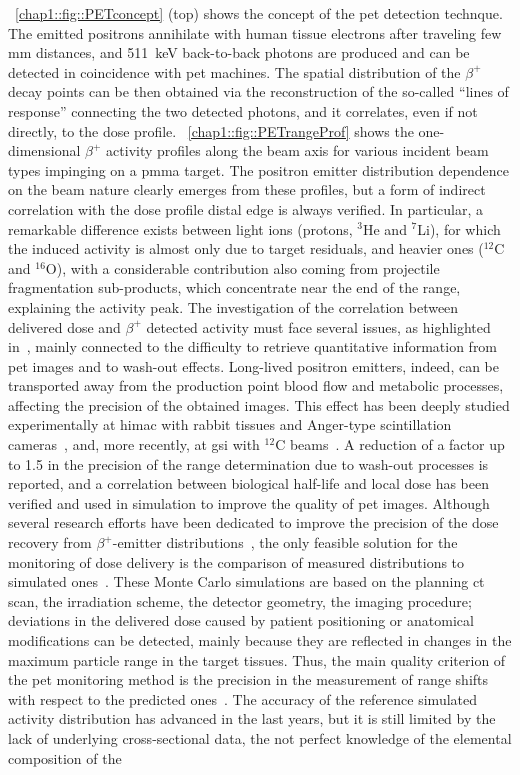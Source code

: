 \figurename~\ref{chap1::fig::PETconcept} (top) shows the concept of the \gls{pet} detection technque. The emitted positrons annihilate with human tissue electrons after traveling few mm distances, and 511~keV back-to-back photons are produced and can be detected in coincidence with \gls{pet} machines. The spatial distribution of the $\beta^+$ decay points can be then obtained via the reconstruction of the so-called \enquote{lines of response} connecting the two detected photons, and it correlates, even if not directly, to the dose profile. \figurename~\ref{chap1::fig::PETrangeProf} shows the one-dimensional $\beta^+$ activity profiles along the beam axis for various incident beam types impinging on a \gls{pmma} target. The positron emitter distribution dependence on the beam nature clearly emerges from these profiles, but a form of indirect correlation with the dose profile distal edge is always verified. In particular, a remarkable difference exists between light ions (protons, $^3$He and $^7$Li), for which the induced activity is almost only due to target residuals, and heavier ones ($^{12}$C and $^{16}$O), with a considerable contribution also coming from projectile fragmentation sub-products, which concentrate near the end of the range, explaining the activity peak. The investigation of the correlation between delivered dose and $\beta^+$ detected activity must face several issues, as highlighted in~\cite{Parodi2004}, mainly connected to the difficulty to retrieve quantitative information from \gls{pet} images and to wash-out effects. Long-lived positron emitters, indeed, can be transported away from the production point blood flow and metabolic processes, affecting the precision of the obtained images. This effect has been deeply studied experimentally at \gls{himac} with rabbit tissues and Anger-type scintillation cameras~\parencite{Mizuno2003, Tomitani2003}, and, more recently, at \gls{gsi} with $^{12}$C beams~\parencite{Fiedler2008}. A reduction of a factor up to 1.5 in the precision of the range determination due to wash-out processes is reported, and a correlation between biological half-life and local dose has been verified and used in simulation to improve the quality of \gls{pet} images. Although several research efforts have been dedicated to improve the precision of the dose recovery from $\beta^+$-emitter distributions~\parencite{Parodi2006, Parodi2007, Parodi2010}, the only feasible solution for the monitoring of dose delivery is the comparison of measured distributions to simulated ones~\parencite{Ponish2004}. These Monte Carlo simulations are based on the planning \gls{ct} scan, the irradiation scheme, the detector geometry, the imaging procedure; deviations in the delivered dose caused by patient positioning or anatomical modifications can be detected, mainly because they are reflected in changes in the maximum particle range in the target tissues. Thus, the main quality criterion of the \gls{pet} monitoring method is the precision in the measurement of range shifts with respect to the predicted ones~\parencite{Fiedler2010}. The accuracy of the reference simulated activity distribution has advanced in the last years, but it is still limited by the lack of underlying cross-sectional data, the not perfect knowledge of the elemental composition of the 